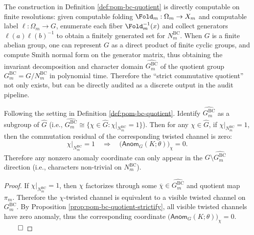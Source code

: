 \begin{remark}\label{rem:pom-bc-quotient-computable}
The construction in Definition \ref{def:pom-bc-quotient} is directly computable on finite resolutions: given computable folding \(\Fold_m:\Omega_m\to X_m\) and computable label \(\ell:\Omega_m\to G\), enumerate each fiber \(\Fold_m^{-1}(x)\) and collect generators
\(
\ell(a)\ell(b)^{-1}
\)
to obtain a finitely generated set for \(N^{\mathrm{BC}}_m\).
When \(G\) is a finite abelian group, one can represent \(G\) as a direct product of finite cyclic groups, and compute Smith normal form on the generator matrix, thus obtaining the invariant decomposition and character domain \(\widehat{G^{\mathrm{BC}}_m}\) of the quotient group \(G^{\mathrm{BC}}_m=G/N^{\mathrm{BC}}_m\) in polynomial time.
Therefore the ``strict commutative quotient'' not only exists, but can be directly audited as a discrete output in the audit pipeline.
\end{remark}

\begin{corollary}\label{cor:pom-anom-supported-on-bc-kernel}
Following the setting in Definition \ref{def:pom-bc-quotient}.
Identify \(\widehat{G^{\mathrm{BC}}_m}\) as a subgroup of \(\widehat G\) (i.e., \(\widehat{G^{\mathrm{BC}}_m}\cong\{\chi\in\widehat G:\chi|_{N^{\mathrm{BC}}_m}=1\}\)).
Then for any \(\chi\in\widehat G\), if \(\chi|_{N^{\mathrm{BC}}_m}=1\), then the commutation residual of the corresponding twisted channel is zero:
\[
\chi|_{N^{\mathrm{BC}}_m}=1
\quad\Longrightarrow\quad
\bigl(\mathsf{Anom}_G(K;\theta)\bigr)_{\chi}=0.
\]
Therefore any nonzero anomaly coordinate can only appear in the \(\widehat G\setminus \widehat{G^{\mathrm{BC}}_m}\) direction (i.e., characters non-trivial on \(N^{\mathrm{BC}}_m\)).
\end{corollary}
\begin{proof}
If \(\chi|_{N^{\mathrm{BC}}_m}=1\), then \(\chi\) factorizes through some \(\overline\chi\in\widehat{G^{\mathrm{BC}}_m}\) and quotient map \(\pi_m\).
Therefore the \(\chi\)-twisted channel is equivalent to a visible twisted channel on \(G^{\mathrm{BC}}_m\).
By Proposition \ref{prop:pom-bc-quotient-strictify}, all visible twisted channels have zero anomaly, thus the corresponding coordinate \(\bigl(\mathsf{Anom}_G(K;\theta)\bigr)_{\chi}=0\). $\qed$
\end{proof}

